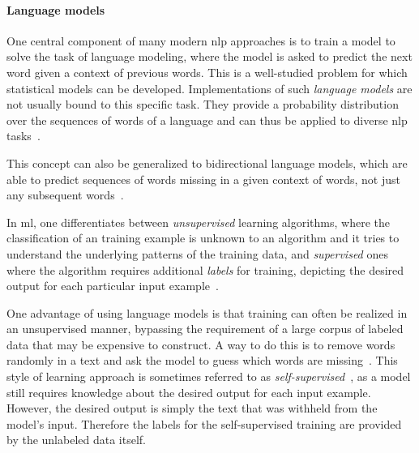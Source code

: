 \paragraph{Language models}

One central component of many modern \ac{nlp} approaches is to train a model
to solve the task of language modeling,
where the model is asked to predict the next word given a context of previous words.
This is a well-studied problem for which statistical models can be developed.
Implementations of such \emph{language models} are not usually bound to this specific task.
They provide a probability distribution over the sequences of words of a language
and can thus be applied to diverse \ac{nlp} tasks~\parencite[71,191]{statistical_nlp}.

This concept can also be generalized to bidirectional language models,
which are able to predict sequences of words missing in a given context of words,
not just any subsequent words~\parencites{bert}[3]{deep_bidirectional_lm}[1758]{bidirectional_lm}.

In \acl{ml}, one differentiates between \emph{unsupervised} learning algorithms,
where the classification of an training example is unknown to an algorithm
and it tries to understand the underlying patterns of the training data,
and \emph{supervised} ones where the algorithm requires additional \emph{labels} for training,
depicting the desired output for each particular input example~\parencites[232]{statistical_nlp}[15]{practical_nlp}.

One advantage of using language models is that training can often be realized in an unsupervised manner,
bypassing the requirement of a large corpus of labeled data that may be expensive to construct.
A way to do this is to remove words randomly in a text and ask the model to guess which words are missing~\parencite{bert}.
This style of learning approach is sometimes referred to as \emph{self-supervised}~\parencite[1]{self_supervised},
as a model still requires knowledge about the desired output for each input example.
However, the desired output is simply the text that was withheld from the model's input.
Therefore the labels for the self-supervised training are provided by the unlabeled data itself.

